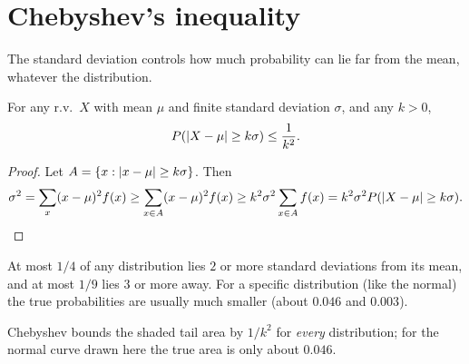 \section{Chebyshev's inequality}

The standard deviation controls how much probability can lie far from the mean, whatever
the distribution.

\begin{theorem}
For any r.v.\ $X$ with mean $\mu$ and finite standard deviation $\sigma$, and any $k > 0$,
\[
  P(\left\lvert X - \mu \right\rvert \ge k\sigma) \le \frac{1}{k^2}.
\]
\end{theorem}

\begin{proof}
Let $A = \{x : \left\lvert x-\mu \right\rvert\ge k\sigma\}$. Then
\[
  \sigma^2 = \sum_x (x-\mu)^2 f(x) \ge \sum_{x\in A}(x-\mu)^2 f(x) \ge k^2\sigma^2
  \sum_{x\in A} f(x) = k^2\sigma^2 P(\left\lvert X-\mu \right\rvert\ge k\sigma).
\]
\end{proof}

\begin{example}
At most $1/4$ of any distribution lies $2$ or more standard deviations from its mean,
and at most $1/9$ lies $3$ or more away. For a specific distribution (like the normal)
the true probabilities are usually much smaller (about $0.046$ and $0.003$).
\end{example}

\begin{center}
\end{center}
Chebyshev bounds the shaded tail area by $1/k^2$ for \emph{every} distribution; for the
normal curve drawn here the true area is only about $0.046$.

